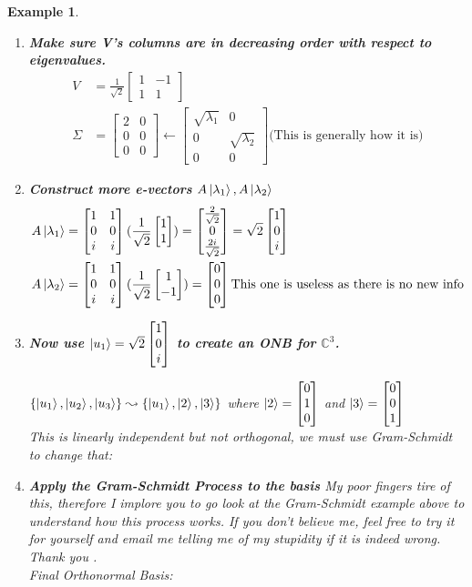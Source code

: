 \documentclass[12pt]{article}
\theoremstyle{plain}
\theoremstyle{nonumberplain}
\theoremstyle{plain}
\newtheorem{example}[lemma]{Example}
\theoremstyle{nonumberplain}
\newcommand\1{{\bf 1}}
\newcommand{\bmat}[1]{\begin{bmatrix*} #1 \end{bmatrix*}} %
\newcommand{\C}{\mathbb{C}} %
\newcommand{\<}{\left\langle}
\renewcommand{\>}{\right\rangle}
\begin{document}
\begin{example}
\begin{enumerate}
\begin{equation}
\end{equation}
\item \textbf{Make sure V's columns are in decreasing order with respect to eigenvalues.}
\begin{align*}
V &= \frac{1}{\sqrt{2}} \bmat{1&-1\\1&1}\\
\Sigma &= \bmat{2&0\\0&0\\0&0} \leftarrow \bmat{\sqrt{\lambda_1}&0\\0&\sqrt{\lambda_2}\\0&0} \text{(This is generally how it is)}
\end{align*}
\item \textbf{Construct more e-vectors $A\ket{\lambda_1}, A\ket{\lambda_2}$} 
\begin{align*}
A\ket{\lambda_1} &= \bmat{1&1\\0&0\\i&i}(\frac{1}{\sqrt{2}} \bmat{1\\1}) = \bmat{\frac{2}{\sqrt{2}}\\ 0\\\frac{2i}{\sqrt{2}}} = \sqrt{2}\bmat{1\\0\\i}\\
A\ket{\lambda_2} &= \bmat{1&1\\0&0\\i&i}(\frac{1}{\sqrt{2}} \bmat{1\\-1}) = \bmat{0\\0\\0} \text{This one is useless as there is no new info}
\end{align*}
\item \textbf{Now use $\ket{u_1} = \sqrt{2}\bmat{1\\0\\i}$ to create an ONB for $\C^3$.} 

$\{\ket{u_1},\ket{u_2},\ket{u_3}\} \leadsto \{\ket{u_1},\ket{2},\ket{3}\}$ where $\ket{2} = \bmat{0\\1\\0}$ and $\ket{3} = \bmat{0\\0\\1}$\\
This is linearly independent but not orthogonal, we must use Gram-Schmidt to change that:

\item \textbf{Apply the Gram-Schmidt Process to the basis}
My poor fingers tire of this, therefore I implore you to go look at the Gram-Schmidt example above to understand how this process works. If you don't believe me, feel free to try it for yourself and email me telling me of my stupidity if it is indeed wrong.  Thank you \smiley{}.\\
Final Orthonormal Basis: 


\end{enumerate}
\end{example}
\end{document}
